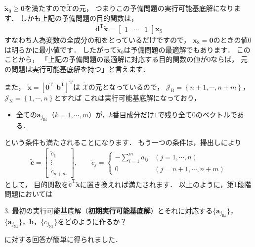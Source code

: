 ﻿\documentclass[a4paper]{jsarticle}
\begin{document}
$\tilde{\boldsymbol{x}}_{0}\geq\boldsymbol{0}$を満たすので$\tilde{\mathcal{X}}$の元，
つまりこの予備問題の実行可能基底解になります．
しかも上記の予備問題の目的関数は，
\begin{align*}
\boldsymbol{d}^{\mathrm{T}}\tilde{\boldsymbol{x}}
=\begin{bmatrix}
1 & \cdots & 1
\end{bmatrix}\boldsymbol{x}_{\mathrm{S}}
\end{align*}
すなわち人為変数の全成分の和をとっているだけですので，
$\boldsymbol{x}_{\mathrm{S}}=\boldsymbol{0}$のときの値$0$は明らかに最小値です．
したがって$\tilde{\boldsymbol{x}}_{0}$は予備問題の最適解でもあります．
このことから，
「上記の予備問題の最適解に対応する目的関数の値が$0$ならば，
元の問題は実行可能基底解を持つ」と言えます．

また，
$\tilde{\boldsymbol{x}}=\left[\boldsymbol{0}^{\mathrm{T}}~~\boldsymbol{b}^{\mathrm{T}}\right]^{\mathrm{T}}$は
$\tilde{\mathcal{X}}$の元となっているので，
$\mathcal{J}_{\mathrm{B}}=\left\{n+1,\cdots,n+m\right\}$，
$\mathcal{J}_{\mathrm{N}}=\left\{1,\cdots,n\right\}$とすれば
これは実行可能基底解になっており，
\begin{screen}
\begin{itemize}
\item{全ての$\boldsymbol{a}_{j_{\mathrm{B}k}}$（$k=1,\cdots,m$）が，$k$番目成分だけ$1$で残り全て$0$のベクトルである．}
\end{itemize}
\end{screen}
という条件も満たされることになります．
もう一つの条件は，掃出しにより
\begin{align*}
\tilde{\boldsymbol{c}}=\begin{bmatrix}
\tilde{c}_{1} \\ \vdots \\ \tilde{c}_{n+m}
\end{bmatrix},
\qquad
\tilde{c}_{j}=\begin{cases}
-\sum_{i=1}^{m}a_{ij} & (j=1,\cdots,n)
\\
0 & (j=n+1,\cdots,n+m)
\end{cases}
\end{align*}
として，
目的関数を$\tilde{\boldsymbol{c}}^{\mathrm{T}}\tilde{\boldsymbol{x}}$に置き換えれば満たされます．
以上のように，第1段階問題においては
\begin{screen}
3. 最初の実行可能基底解（{\bf 初期実行可能基底解}）とそれに対応する$\{\boldsymbol{a}_{j_{\mathrm{B}k}}\}$，$\{\boldsymbol{a}_{j_{\mathrm{N}k}}\}$，$\boldsymbol{b}$，$\{c_{j_{\mathrm{N}k}}\}$をどのように作るか？
\end{screen}
に対する回答が簡単に得られました．
\end{document}
